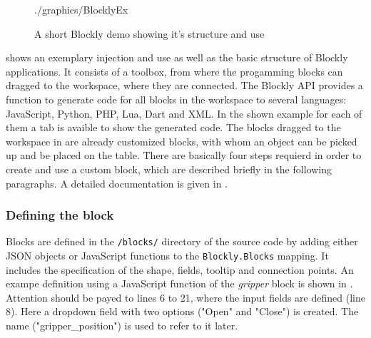 \begin{figure}[htbp]
	\centering
	\begin{overpic}[width=0.9\linewidth]{./graphics/BlocklyEx}
	\end{overpic}
	\caption{A short Blockly demo showing it's structure and use}%
	\label{fig:BlocklyEx}%
\end{figure}

 shows an exemplary injection and use as well as the basic structure of Blockly applications. It consists of a toolbox, from where the progamming blocks can dragged to the workspace, where they are connected. The Blockly API \cite{BlocklyAPI} provides a function to generate code for all blocks in the workspace to several languages: JavaScript, Python, PHP, Lua, Dart and XML. In the shown example for each of them a tab is avaible to show the generated code. The blocks dragged to the workspace in  are already customized blocks, with whom an object can be picked up and be placed on the table. There are basically four steps requierd in order to create and use a custom block, which are described briefly in the following paragraphs. A detailed documentation is given in \cite{BlocklyCustomBlocks}.

\subsubsection{Defining the block}
Blocks are defined in the \lstinline!/blocks/! directory of the source code by adding either JSON objects or JavaScript functions to the \lstinline!Blockly.Blocks! mapping. It includes the specification of the shape, fields, tooltip and connection points. An exampe definition using a JavaScript function of the \textit{gripper} block is shown in . Attention should be payed to lines 6 to 21, where the input fields are defined (line 8). Here a dropdown field with two options ("Open" and "Close") is created. The name ("gripper\_position") is used to refer to it later.

\begin{figure}[htbp]
	
\end{figure}

